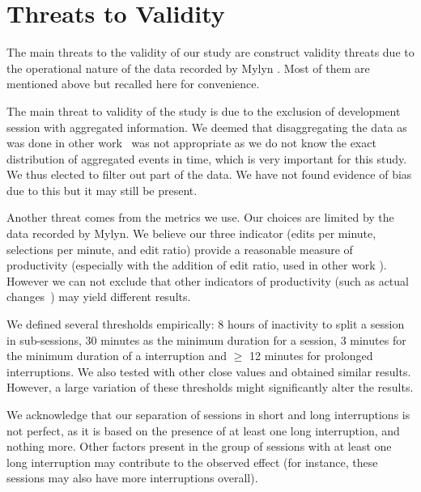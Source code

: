 \documentclass[conference]{IEEEtran}
\begin{document}
\section{Threats to Validity}
The main threats to the validity of our study are construct validity threats due to the operational nature of the data recorded by Mylyn \cite{M14}. Most of them are mentioned above but recalled here for convenience.

The main threat to validity of the study is due to the exclusion of development session with aggregated information. We deemed that disaggregating the data as was done in other work~\cite{YR11}  was not appropriate as we do not know the exact distribution of aggregated events in time, which is very important for this study. We thus elected to filter out part of the data. We have not found evidence of bias due to this but it may still be present.

Another threat comes from the metrics we use. Our choices are limited by the data recorded by Mylyn. We believe our three indicator (edits per minute, selections per minute, and edit ratio) provide a reasonable measure of productivity (especially with the addition of edit ratio, used in other work \cite{KM06}). However we can not exclude that other indicators of productivity (such as actual changes~\cite{RL10}) may yield different results.

We defined several thresholds empirically: 8 hours of inactivity to split a session in sub-sessions, 30 minutes as the minimum duration for a session, 3 minutes for the minimum duration of a interruption and  $\geq$ 12 minutes for prolonged interruptions. We also tested with other close values and obtained similar results. However, a large variation of these thresholds might significantly alter the results. 

We acknowledge that our separation of sessions in short and long interruptions is not perfect, as it is based on the presence of at least one long interruption, and nothing more. Other factors present in the group of sessions with at least one long interruption may contribute to the observed effect (for instance, these sessions may also have more interruptions overall).

\end{document}
